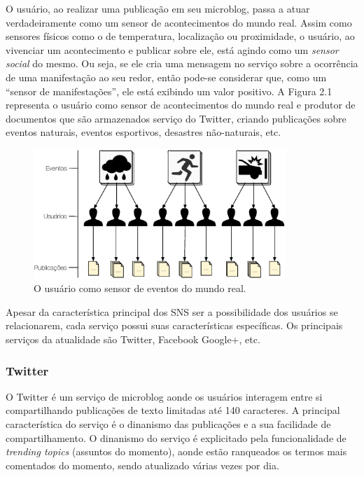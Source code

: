 O usuário, ao realizar uma publicação em seu microblog, passa a atuar verdadeiramente como um sensor de acontecimentos do mundo real. Assim como sensores físicos como o de temperatura, localização ou proximidade, o usuário, ao vivenciar um acontecimento e publicar sobre ele, está agindo como um \textit{sensor social} do mesmo. Ou seja, se ele cria uma mensagem no serviço sobre a ocorrência de uma manifestação ao seu redor, então pode-se considerar que, como um ``sensor de manifestações'', ele está exibindo um valor positivo. A Figura 2.1 representa o usuário como sensor de acontecimentos do mundo real e produtor de documentos que são armazenados serviço do Twitter, criando publicações sobre eventos naturais, eventos esportivos, desastres não-naturais, etc.

\begin{figure}[htpb]
	\begin{center}
		\includegraphics[width=0.85\textwidth]{figuras/event-perception-2.eps}
		\caption{O usuário como sensor de eventos do mundo real.}
	\end{center}
\end{figure}

Apesar da característica principal dos SNS ser a possibilidade dos usuários se relacionarem, cada serviço possui suas características específicas. Os principais serviços da atualidade são Twitter, Facebook Google+, etc.

\subsubsection*{Twitter}

O Twitter é um serviço de microblog aonde os usuários interagem entre si compartilhando publicações de texto limitadas até 140 caracteres. A principal característica do serviço é o dinanismo das publicações e a sua facilidade de compartilhamento. O dinanismo do serviço é explicitado pela funcionalidade de \textit{trending topics} (assuntos do momento), aonde estão ranqueados os termos mais comentados do momento, sendo atualizado várias vezes por dia.


